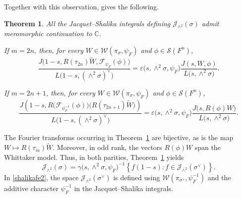 \documentclass[12pt,reqno]{amsart}
\numberwithin{equation}{section}%
\numberwithin{equation}{subsection}
\newtheorem{thm}[equation]{Theorem}%
\theoremstyle{definition}
\theoremstyle{remark}
\begin{document}
Together with this observation,
\cite[Theorem~2.2(1),(2)]{JLST2025} gives the following.

\begin{thm}
\label{fe2}
All the Jacquet--Shalika integrals defining
\(\mathcal{J}_{\wedge^2}(\sigma)\) admit meromorphic continuation to
\(\mathbb{C}\).

If \(m=2n\), then, for every
\(W\in\mathcal{W}(\pi_\sigma,\psi_F)\) and
\(\phi\in\mathcal{S}(F^n)\),
\[
\frac{
J\bigl(
1-s,
R(\tau_{2n})\widetilde W,
\mathcal{F}_{\psi_F}(\phi)
\bigr)
}{
L\bigl(1-s,(\wedge^2\sigma)^\vee\bigr)
}
=
\varepsilon\bigl(s,\wedge^2\sigma,\psi_F\bigr)
\frac{J(s,W,\phi)}
     {L\bigl(s,\wedge^2\sigma\bigr)}.
\]

If \(m=2n+1\), then, for every
\(W\in\mathcal{W}(\pi_\sigma,\psi_F)\) and
\(\phi\in\mathcal{S}(F^n)\),
\[
\frac{
J\left(
1-s,
R\bigl(\mathcal{F}_{\psi_F^{-1}}(\phi)\bigr)
\bigl(R(\tau_{2n+1})\widetilde W\bigr)
\right)
}{
L\bigl(1-s,(\wedge^2\sigma)^\vee\bigr)
}
=
\varepsilon\bigl(s,\wedge^2\sigma,\psi_F\bigr)
\frac{J\bigl(s,R(\phi)W\bigr)}
     {L\bigl(s,\wedge^2\sigma\bigr)}.
\]
\end{thm}

The Fourier transforms occurring in Theorem~\ref{fe2} are bijective,
as is the map
\(W\longmapsto R(\tau_m)\widetilde W\). Moreover, in odd rank, the
vectors \(R(\phi)W\) span the Whittaker model. Thus, in both parities,
Theorem~\ref{fe2} yields
\begin{equation}
\label{shalikafe2}
\mathcal{J}_{\wedge^2}(\sigma)
=
\gamma\bigl(s,\wedge^2\sigma,\psi_F\bigr)^{-1}
\left\{
f(1-s):
f\in\mathcal{J}_{\wedge^2}(\sigma^\vee)
\right\}.
\end{equation}
In \eqref{shalikafe2}, the space
\(\mathcal{J}_{\wedge^2}(\sigma^\vee)\) is defined using
\(\mathcal{W}(\pi_{\sigma^\vee},\psi_F^{-1})\) and the additive
character \(\psi_F^{-1}\) in the Jacquet--Shalika integrals.
\end{document}
